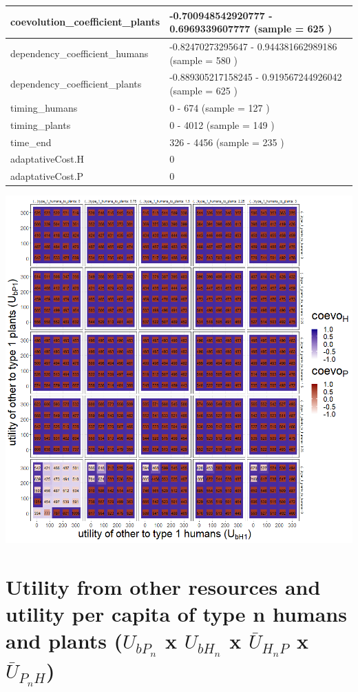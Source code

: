 \documentclass[
]{book}
\begin{document}
\begin{table}[!h]
\begin{tabular}[t]{l|l}
\hline
coevolution\_coefficient\_plants & -0.700948542920777 - 0.6969339607777 (sample = 625 )\\
\hline
dependency\_coefficient\_humans & -0.82470273295647 - 0.944381662989186 (sample = 580 )\\
\hline
dependency\_coefficient\_plants & -0.889305217158245 - 0.919567244926042 (sample = 625 )\\
\hline
timing\_humans & 0 - 674 (sample = 127 )\\
\hline
timing\_plants & 0 - 4012 (sample = 149 )\\
\hline
time\_end & 326 - 4456 (sample = 235 )\\
\hline
adaptativeCost.H & 0\\
\hline
adaptativeCost.P & 0\\
\hline
\end{tabular}
\end{table}

\newpage

\includegraphics[width=1\linewidth]{plots/4_exp_type_1_traits-tripleRaster_fourParameterss}

\newpage

\hypertarget{utility-from-other-resources-and-utility-per-capita-of-type-n-humans-and-plants-u_bp_n-x-u_bh_n-x-baru_h_np-x-baru_p_nh}{%
\section{\texorpdfstring{Utility from other resources and utility per capita of type n humans and plants (\(U_{bP_{n}}\) x \(U_{bH_{n}}\) x \(\bar{U}_{H_{n}P}\) x \(\bar{U}_{P_{n}H}\))}{Utility from other resources and utility per capita of type n humans and plants (U\_\{bP\_\{n\}\} x U\_\{bH\_\{n\}\} x \textbackslash bar\{U\}\_\{H\_\{n\}P\} x \textbackslash bar\{U\}\_\{P\_\{n\}H\})}}\label{utility-from-other-resources-and-utility-per-capita-of-type-n-humans-and-plants-u_bp_n-x-u_bh_n-x-baru_h_np-x-baru_p_nh}}
\end{document}
